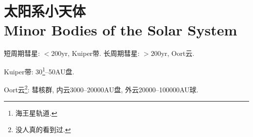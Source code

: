 \chapter{太阳系小天体\\Minor Bodies of the Solar System}

短周期彗星: $<200\text{yr}$, Kuiper带. 长周期彗星: $>200\text{yr}$, Oort云.

Kuiper带: 30\footnote{海王星轨道.}--50AU盘.

Oort云\footnote{没人真的看到过.}: 彗核群, 内云3000--20000AU盘, 外云20000--100000AU球.
